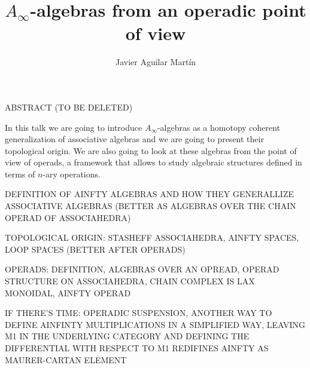 \documentclass{beamer}
\title{$A_\infty$-algebras from an operadic point of view}
\author{Javier Aguilar Mart\'in}
\institute{University of Kent}
\date{}
\theoremstyle{definition}
\begin{document}
\frame{\titlepage}
%
% 
% 
% 

% 



\newcommand{\seti}{\setcounter{saveenumi}{\value{enumi}}}
\newcommand{\conti}{\setcounter{enumi}{\value{saveenumi}}}

\makeatletter
\newcommand{\xRightarrow}[2][]{\ext@arrow 0359\Rightarrowfill@{#1}{#2}}
\makeatother


\begin{frame}
ABSTRACT (TO BE DELETED)

In this talk we are going to introduce $A_\infty$-algebras as a homotopy coherent generalization of associative algebras and we are going to present their topological origin. We are also going to look at these algebras from the point of view of operads, a framework that allows to study algebraic structures defined in terms of $n$-ary operations.
\end{frame}




\begin{frame}
DEFINITION OF AINFTY ALGEBRAS AND HOW THEY GENERALLIZE ASSOCIATIVE ALGEBRAS (BETTER AS ALGEBRAS OVER THE CHAIN OPERAD OF ASSOCIAHEDRA)

TOPOLOGICAL ORIGIN: STASHEFF ASSOCIAHEDRA, AINFTY SPACES, LOOP SPACES (BETTER AFTER OPERADS)

OPERADS: DEFINITION, ALGEBRAS OVER AN OPREAD, OPERAD STRUCTURE ON ASSOCIAHEDRA, CHAIN COMPLEX IS LAX MONOIDAL, AINFTY OPERAD

IF THERE'S TIME: OPERADIC SUSPENSION, ANOTHER WAY TO DEFINE AINFINTY MULTIPLICATIONS IN A SIMPLIFIED WAY, LEAVING M1 IN THE UNDERLYING CATEGORY AND DEFINING THE DIFFERENTIAL WITH RESPECT TO M1 REDIFINES AINFTY AS MAURER-CARTAN ELEMENT
\end{frame}
\end{document}
